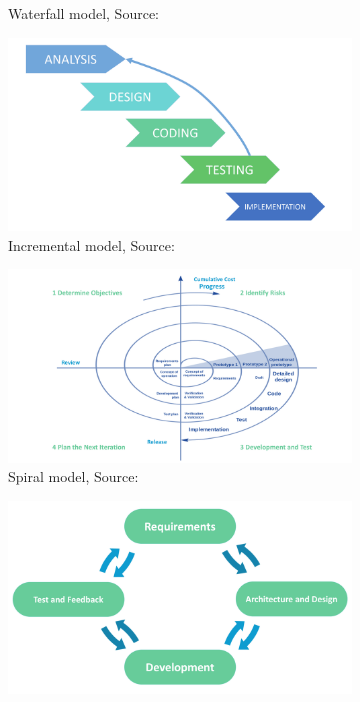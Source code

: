 \begin{figure}[htbp]
\begin{subfigure}[b]{0.45\textwidth}
		\caption{Waterfall model, Source: \citet{Team:2017}}
		\label{fig: 2}
	\end{subfigure}
	\medskip
	\begin{subfigure}[b]{0.45\textwidth}
		\centering
		\includegraphics[width=\linewidth]{./iterative}
		\caption{Incremental model, Source: \citet{Team:2017}}
		\label{fig: 3}
	\end{subfigure}
	\hfill
	\begin{subfigure}[b]{0.45\textwidth}
		\centering
		\includegraphics[width=\linewidth]{./Spiral}
		\caption{Spiral model, Source: \citet{Team:2017}}
		\label{fig: 4}
	\end{subfigure}
	\medskip
	\begin{subfigure}[b]{0.45\textwidth}
		\centering
		\includegraphics[width=\linewidth]{./Agile}

\end{subfigure}
\end{figure}
